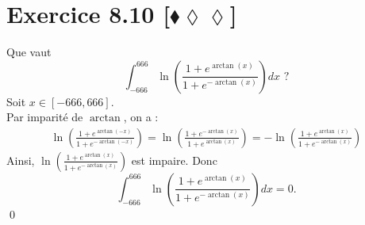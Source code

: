 \documentclass[10pt]{article}
\begin{document}
\section*{Exercice 8.10 [$\blacklozenge\lozenge\lozenge$]}
\begin{tcolorbox}[enhanced, width=7in, center, size=fbox, fontupper=\large, drop shadow southwest]
    Que vaut
    \begin{equation*}
        \int_{-666}^{666}{\ln\left(\frac{1+e^{\arctan(x)}}{1+e^{-\arctan(x)}}\right)dx} \text{ ?}
    \end{equation*}
    Soit $x\in[-666,666]$.\\
    Par imparité de $\arctan$, on a :
    \begin{align*}
        \ln\left(\frac{1+e^{\arctan(-x)}}{1+e^{-\arctan(-x)}}\right)=\ln\left(\frac{1+e^{-\arctan(x)}}{1+e^{\arctan(x)}}\right)=-\ln\left(\frac{1+e^{\arctan(x)}}{1+e^{-\arctan(x)}}\right)
    \end{align*}
    Ainsi, $\ln\left(\frac{1+e^{\arctan(x)}}{1+e^{-\arctan(x)}}\right)$ est impaire. Donc 
    \begin{equation*}
        \int_{-666}^{666}{\ln\left(\frac{1+e^{\arctan(x)}}{1+e^{-\arctan(x)}}\right)dx}=0.
    \end{equation*}
    \qed
\end{tcolorbox}

\end{document}
